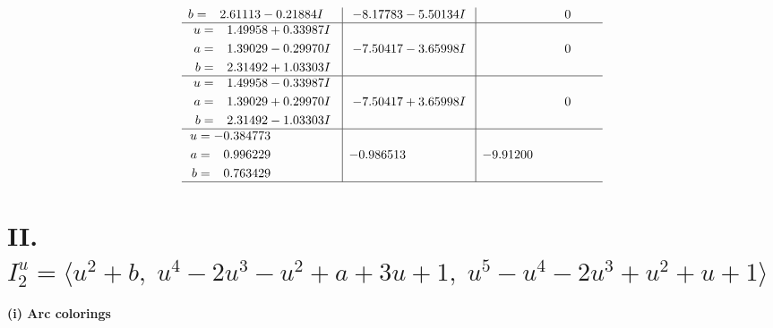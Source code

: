 \documentclass[1p]{elsarticle_modified}
\theoremstyle{definition}
\begin{document}
$$\begin{array}{c|c|c}
\begin{aligned}
b &= \phantom{-}2.61113 - 0.21884 I\end{aligned}
 & -8.17783 - 5.50134 I & \phantom{-0.000000 } 0 \\ \hline\begin{aligned}
u &= \phantom{-}1.49958 + 0.33987 I \\
a &= \phantom{-}1.39029 - 0.29970 I \\
b &= \phantom{-}2.31492 + 1.03303 I\end{aligned}
 & -7.50417 - 3.65998 I & \phantom{-0.000000 } 0 \\ \hline\begin{aligned}
u &= \phantom{-}1.49958 - 0.33987 I \\
a &= \phantom{-}1.39029 + 0.29970 I \\
b &= \phantom{-}2.31492 - 1.03303 I\end{aligned}
 & -7.50417 + 3.65998 I & \phantom{-0.000000 } 0 \\ \hline\begin{aligned}
u &= -0.384773\phantom{ +0.000000I} \\
a &= \phantom{-}0.996229\phantom{ +0.000000I} \\
b &= \phantom{-}0.763429\phantom{ +0.000000I}\end{aligned}
 & -0.986513\phantom{ +0.000000I} & -9.91200\phantom{ +0.000000I}\\
 \hline 
 \end{array}$$\newpage\newpage\renewcommand{\arraystretch}{1}
\centering \section*{II. $I^u_{2}= \langle u^2+b,\;u^4-2 u^3- u^2+a+3 u+1,\;u^5- u^4-2 u^3+u^2+u+1 \rangle$}
\flushleft \textbf{(i) Arc colorings}\\
\end{document}
